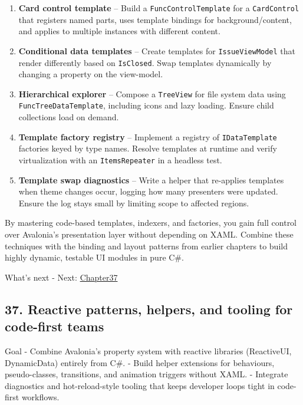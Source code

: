 \begin{enumerate}
\def\labelenumi{\arabic{enumi}.}
\tightlist
\item
  \textbf{Card control template} -- Build a
  \passthrough{\lstinline!FuncControlTemplate!} for a
  \passthrough{\lstinline!CardControl!} that registers named parts, uses
  template bindings for background/content, and applies to multiple
  instances with different content.
\item
  \textbf{Conditional data templates} -- Create templates for
  \passthrough{\lstinline!IssueViewModel!} that render differently based
  on \passthrough{\lstinline!IsClosed!}. Swap templates dynamically by
  changing a property on the view-model.
\item
  \textbf{Hierarchical explorer} -- Compose a
  \passthrough{\lstinline!TreeView!} for file system data using
  \passthrough{\lstinline!FuncTreeDataTemplate!}, including icons and
  lazy loading. Ensure child collections load on demand.
\item
  \textbf{Template factory registry} -- Implement a registry of
  \passthrough{\lstinline!IDataTemplate!} factories keyed by type names.
  Resolve templates at runtime and verify virtualization with an
  \passthrough{\lstinline!ItemsRepeater!} in a headless test.
\item
  \textbf{Template swap diagnostics} -- Write a helper that re-applies
  templates when theme changes occur, logging how many presenters were
  updated. Ensure the log stays small by limiting scope to affected
  regions.
\end{enumerate}

By mastering code-based templates, indexers, and factories, you gain
full control over Avalonia's presentation layer without depending on
XAML. Combine these techniques with the binding and layout patterns from
earlier chapters to build highly dynamic, testable UI modules in pure
C\#.

What's next - Next: \href{Chapter37.md}{Chapter37}

\newpage

\subsection{37. Reactive patterns, helpers, and tooling for code-first
teams}\label{reactive-patterns-helpers-and-tooling-for-code-first-teams}

Goal - Combine Avalonia's property system with reactive libraries
(ReactiveUI, DynamicData) entirely from C\#. - Build helper extensions
for behaviours, pseudo-classes, transitions, and animation triggers
without XAML. - Integrate diagnostics and hot-reload-style tooling that
keeps developer loops tight in code-first workflows.

